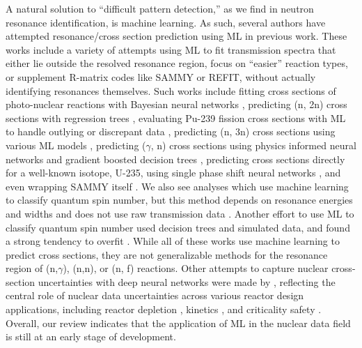 \documentclass{style/nseJournal}
\begin{document}
A natural solution to ``difficult pattern detection,'' as we find in neutron resonance identification, is machine learning. As such, several authors have attempted resonance/cross section prediction using ML in previous work. These works include a variety of attempts using ML to fit transmission spectra that either lie outside the resolved resonance region, focus on ``easier'' reaction types, or supplement R-matrix codes like SAMMY or REFIT, without actually identifying resonances themselves. Such works include fitting cross sections of photo-nuclear reactions with Bayesian neural networks \cite{sunEnhancingReliabilityPhotonuclear2025}, predicting (n, 2n) cross sections with regression trees \cite{teelock-gayaPredictionExoticN2n}, evaluating Pu-239 fission cross sections with ML to handle outlying or discrepant data \cite{whewellEvaluating239PunfCross2020}, predicting (n, 3n) cross sections using various ML models \cite{aliuncuPredictingN3nNuclear2025}, predicting ($\gamma$, n) cross sections using physics informed neural networks and gradient boosted decision trees \cite{besnard-vauterinExperimentalDatadrivenModeling2025},  predicting cross sections directly for a well-known isotope, U-235, using single phase shift neural networks \cite{huNovelDeepLearningbased2024}, and even wrapping SAMMY itself \cite{pleiades}. We also see analyses which use machine learning to classify quantum spin number, but this method depends on resonance energies and widths and does not use raw transmission data \cite{nobreNovelMachinelearningMethod2023}. Another effort to use ML to classify quantum spin number used decision trees and simulated data, and found a strong tendency to overfit \cite{brownMachineLearningApplied2020}. While all of these works use machine learning to predict cross sections, they are not generalizable methods for the resonance region of (n,$\gamma$), (n,n), or (n, f) reactions. Other attempts to capture nuclear cross-section uncertainties with deep neural networks were made by \cite{radaideh2021modeling}, reflecting the central role of nuclear data uncertainties across various reactor design applications, including reactor depletion \cite{radaideh2019advanced}, kinetics \cite{radaideh2019new}, and criticality safety \cite{price2019advanced,radaideh2018criticality}. Overall, our review indicates that the application of ML in the nuclear data field is still at an early stage of development.
\end{document}
